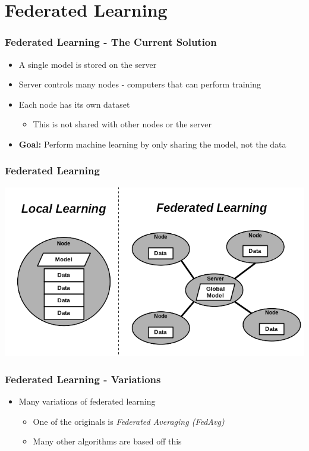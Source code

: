 \documentclass{beamer}
\begin{document}
	\section{Federated Learning}
	\begin{frame}
		\frametitle{Federated Learning - The Current Solution}
		\begin{itemize}
			\item A single model is stored on the server
			\item Server controls many nodes - computers that can perform training
			\item Each node has its own dataset
			\begin{itemize}
				\item This is not shared with other nodes or the server
			\end{itemize}
			\item \textbf{Goal:} Perform machine learning by only sharing the model, not the data
		\end{itemize}
	\end{frame}

	\begin{frame}
		\frametitle{Federated Learning}
		\includegraphics[width=\linewidth]{fed}
	\end{frame}

	\begin{frame}
		\frametitle{Federated Learning - Variations}
		\begin{itemize}
			\item Many variations of federated learning
			\begin{itemize}
				\item One of the originals is \emph{Federated Averaging (FedAvg)}
				\item Many other algorithms are based off this
			\end{itemize}
		\end{itemize}
	\end{frame}
\end{document}
